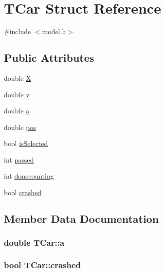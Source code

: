 \hypertarget{struct_t_car}{}\section{T\+Car Struct Reference}
\label{struct_t_car}


{\ttfamily \#include $<$model.\+h$>$}

\subsection*{Public Attributes}
\begin{DoxyCompactItemize}
\item 
double \hyperlink{struct_t_car_a3847ee9ca0df36a71e723acb0527e444}{X}
\item 
double \hyperlink{struct_t_car_af757ff36edd338d56a61e8b6d7fd7cf3}{v}
\item 
double \hyperlink{struct_t_car_ae8093652e187b797fe4c347547d4e24f}{a}
\item 
double \hyperlink{struct_t_car_a90e6fa494374d52326e298a106a90ea2}{pos}
\item 
bool \hyperlink{struct_t_car_a31e5e550847ac32e69ae8e349e3fb284}{is\+Selected}
\item 
int \hyperlink{struct_t_car_a2570c12a3c93fe749cc3c48bb1cedde2}{passed}
\item 
int \hyperlink{struct_t_car_a5dc6b6e98dc6b579e3c03066e6f85e41}{donecounting}
\item 
bool \hyperlink{struct_t_car_ab39a931c266de9624c64b6d3e87bbf1a}{crashed}
\end{DoxyCompactItemize}


\subsection{Member Data Documentation}
\subsubsection[{\texorpdfstring{a}{a}}]{\setlength{\rightskip}{0pt plus 5cm}double T\+Car\+::a}\hypertarget{struct_t_car_ae8093652e187b797fe4c347547d4e24f}{}\label{struct_t_car_ae8093652e187b797fe4c347547d4e24f}
\subsubsection[{\texorpdfstring{crashed}{crashed}}]{\setlength{\rightskip}{0pt plus 5cm}bool T\+Car\+::crashed}\hypertarget{struct_t_car_ab39a931c266de9624c64b6d3e87bbf1a}{}\label{struct_t_car_ab39a931c266de9624c64b6d3e87bbf1a}
